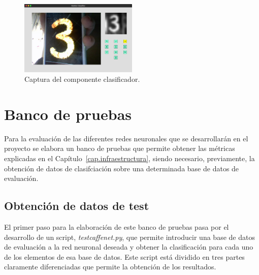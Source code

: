 \begin{figure}[H]
	\begin{center}
		\includegraphics[width=0.5\textwidth]{figures/componente1}
		\caption{Captura del componente clasificador.}
		\label{fig.componente1}
	\end{center}
\end{figure}
\vspace{30pt}
\section{Banco de pruebas} \label{sec.banco}
Para la evaluación de las diferentes redes neuronales que se desarrollarán en el proyecto se elabora un banco de pruebas que permite obtener las métricas explicadas en el Capítulo~\ref{cap.infraestructura}, siendo necesario, previamente, la obtención de datos de clasifciación sobre una determinada base de datos de evaluación.\\
\subsection{Obtención de datos de test}
El primer paso para la elaboración de este banco de pruebas pasa por el desarrollo de un script, \textit{testcaffenet.py}, que permite introducir una base de datos de evaluación a la red neuronal deseada y obtener la clasificación para cada uno de los elementos de esa base de datos. Este script está dividido en tres partes claramente diferenciadas que permite la obtención de los resultados.\\

